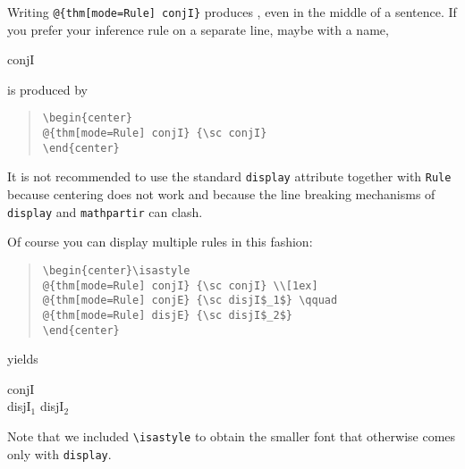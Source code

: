 \begin{isabellebody}
\begin{isamarkuptext}
Writing \verb!@!\verb!{thm[mode=Rule] conjI}! produces
, even in the middle of a sentence.
If you prefer your inference rule on a separate line, maybe with a name,
\begin{center}
 {\sc conjI}
\end{center}
is produced by
\begin{quote}
\verb!\begin{center}!\\
\verb!@!\verb!{thm[mode=Rule] conjI} {\sc conjI}!\\
\verb!\end{center}!
\end{quote}
It is not recommended to use the standard \texttt{display} attribute
together with \texttt{Rule} because centering does not work and because
the line breaking mechanisms of \texttt{display} and \texttt{mathpartir} can
clash.

Of course you can display multiple rules in this fashion:
\begin{quote}
\verb!\begin{center}\isastyle!\\
\verb!@!\verb!{thm[mode=Rule] conjI} {\sc conjI} \\[1ex]!\\
\verb!@!\verb!{thm[mode=Rule] conjE} {\sc disjI$_1$} \qquad!\\
\verb!@!\verb!{thm[mode=Rule] disjE} {\sc disjI$_2$}!\\
\verb!\end{center}!
\end{quote}
yields
\begin{center}\isastyle
{} {\sc conjI} \\[1ex]
 {\sc disjI$_1$} \qquad
{} {\sc disjI$_2$}
\end{center}
Note that we included \verb!\isastyle! to obtain
the smaller font that otherwise comes only with \texttt{display}.


\end{isamarkuptext}
\end{isabellebody}
